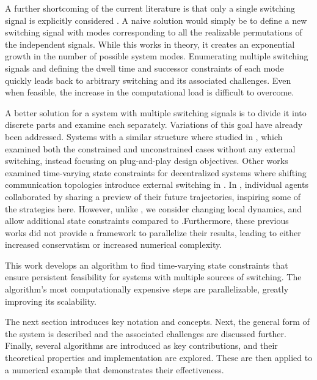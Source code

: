 A further shortcoming of the current literature is that only a single switching signal is explicitly considered \cite{Danielson2019,Athanasopoulos2017,Zhang2016, Santis2004}. A naive solution would simply be to define a new switching signal with modes corresponding to all the realizable permutations of the independent signals. While this works in theory, it creates an exponential growth in the number of possible system modes. Enumerating multiple switching signals and defining the dwell time and successor constraints of each mode quickly leads back to arbitrary switching and its associated challenges. Even when feasible, the increase in the computational load is difficult to overcome. 

A better solution for a system with multiple switching signals is to divide it into discrete parts and examine each separately. Variations of this goal have already been addressed. Systems with a similar structure where studied in \cite{Riverso2015}, which examined both the constrained and unconstrained cases without any external switching, instead focusing on plug-and-play design objectives. Other works examined time-varying state constraints for decentralized systems where shifting communication topologies introduce external switching in \cite{Ahandani2020, Li2020}. In \cite{Li2020}, individual agents collaborated by sharing a preview of their future trajectories, inspiring some of the strategies here. However, unlike \cite{Ahandani2020, Li2020}, we consider changing local dynamics, and allow additional state constraints compared to \cite{Li2020}.Furthermore, these previous works did not provide a framework to parallelize their results, leading to either increased conservatism or increased numerical complexity.

This work develops an algorithm to find time-varying state constraints that ensure persistent feasibility for systems with multiple sources of switching. The algorithm's most computationally expensive steps are parallelizable, greatly improving its scalability. 

The next section introduces key notation and concepts. Next, the general form of the system is described and the associated challenges are discussed further. Finally, several algorithms are introduced as key contributions, and their theoretical properties and implementation are explored. These are then applied to a numerical example that demonstrates their effectiveness. 